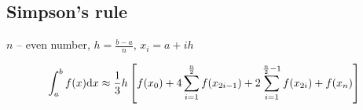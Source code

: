 \subsection{Simpson's rule}
$n$ -- even number, $h = \frac{b - a}{n}$, $x_i = a + i h$

\[\int_a^b f(x) \mathrm{d} x \approx \frac{1}{3} h \left[f(x_0) + 4 \sum_{i = 1}^{\frac{n}{2}} f(x_{2 i - 1}) + 
2 \sum_{i = 1}^{\frac{n}{2} - 1} f(x_{2 i}) + f(x_n) \right] \]
